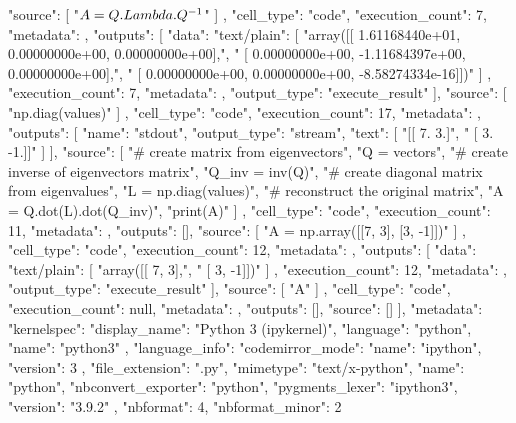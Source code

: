 {{   "source": [
    "$ A = Q. \\Lambda.Q^{-1}$"
   ]
  },
  {
   "cell_type": "code",
   "execution_count": 7,
   "metadata": {},
   "outputs": [
    {
     "data": {
      "text/plain": [
       "array([[ 1.61168440e+01,  0.00000000e+00,  0.00000000e+00],\n",
       "       [ 0.00000000e+00, -1.11684397e+00,  0.00000000e+00],\n",
       "       [ 0.00000000e+00,  0.00000000e+00, -8.58274334e-16]])"
      ]
     },
     "execution_count": 7,
     "metadata": {},
     "output_type": "execute_result"
    }
   ],
   "source": [
    "np.diag(values)"
   ]
  },
  {
   "cell_type": "code",
   "execution_count": 17,
   "metadata": {},
   "outputs": [
    {
     "name": "stdout",
     "output_type": "stream",
     "text": [
      "[[ 7.  3.]\n",
      " [ 3. -1.]]\n"
     ]
    }
   ],
   "source": [
    "# create matrix from eigenvectors\n",
    "Q = vectors\n",
    "# create inverse of eigenvectors matrix\n",
    "Q_inv = inv(Q)\n",
    "# create diagonal matrix from eigenvalues\n",
    "L = np.diag(values)\n",
    "# reconstruct the original matrix\n",
    "A = Q.dot(L).dot(Q_inv)\n",
    "print(A)"
   ]
  },
  {
   "cell_type": "code",
   "execution_count": 11,
   "metadata": {},
   "outputs": [],
   "source": [
    "A = np.array([[7, 3], [3, -1]])"
   ]
  },
  {
   "cell_type": "code",
   "execution_count": 12,
   "metadata": {},
   "outputs": [
    {
     "data": {
      "text/plain": [
       "array([[ 7,  3],\n",
       "       [ 3, -1]])"
      ]
     },
     "execution_count": 12,
     "metadata": {},
     "output_type": "execute_result"
    }
   ],
   "source": [
    "A"
   ]
  },
  {
   "cell_type": "code",
   "execution_count": null,
   "metadata": {},
   "outputs": [],
   "source": []
  }
 ],
 "metadata": {
  "kernelspec": {
   "display_name": "Python 3 (ipykernel)",
   "language": "python",
   "name": "python3"
  },
  "language_info": {
   "codemirror_mode": {
    "name": "ipython",
    "version": 3
   },
   "file_extension": ".py",
   "mimetype": "text/x-python",
   "name": "python",
   "nbconvert_exporter": "python",
   "pygments_lexer": "ipython3",
   "version": "3.9.2"
  }
 },
 "nbformat": 4,
 "nbformat_minor": 2
}
